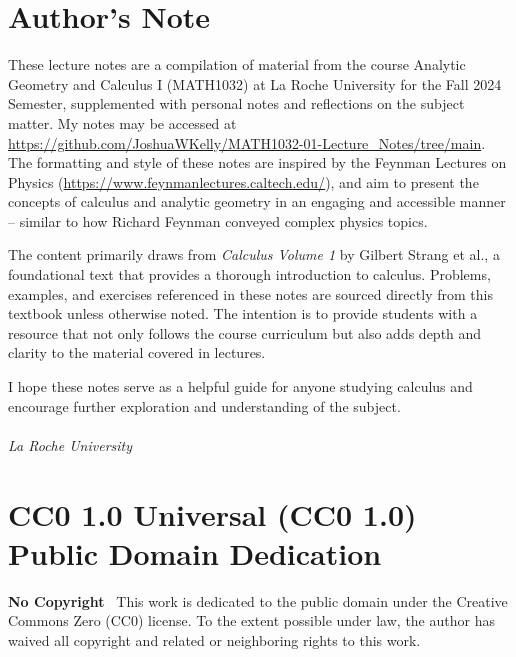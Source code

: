 \documentclass{notes}
\begin{document}
\maketitle %

\section*{Author's Note} %
These lecture notes are a compilation of material from the course Analytic Geometry and Calculus I (MATH1032) at La Roche University for the Fall 2024 Semester, supplemented with personal notes and reflections on the subject matter. My notes may be accessed at \\ \url{https://github.com/JoshuaWKelly/MATH1032-01-Lecture_Notes/tree/main}. The formatting and style of these notes are inspired by the Feynman Lectures on Physics (\url{https://www.feynmanlectures.caltech.edu/}), and aim to present the concepts of calculus and analytic geometry in an engaging and accessible manner -- similar to how Richard Feynman conveyed complex physics topics.

The content primarily draws from \textit{Calculus Volume 1} by Gilbert Strang et al.\cite{strang_calculus_2016}, a foundational text that provides a thorough introduction to calculus. Problems, examples, and exercises referenced in these notes are sourced directly from this textbook unless otherwise noted. The intention is to provide students with a resource that not only follows the course curriculum but also adds depth and clarity to the material covered in lectures.

I hope these notes serve as a helpful guide for anyone studying calculus and encourage further exploration and understanding of the subject.\\

 \\
\textit{La Roche University} \\ 

\newpage

\vfill

\section*{CC0 1.0 Universal (CC0 1.0) Public Domain Dedication}

\textbf{No Copyright}  
\faCreativeCommons~This work is dedicated to the public domain under the Creative Commons Zero (CC0) license. To the extent possible under law, the author has waived all copyright and related or neighboring rights to this work. 
\end{document}
